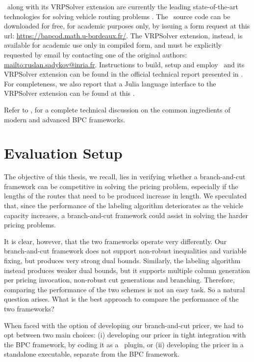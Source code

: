 \medskip

\bapcod\ along with its VRPSolver extension are currently the leading state-of-the-art
technologies for solving vehicle routing problems \parencite{pessoa2020generic}.
The \bapcod\ source code can be downloaded for free, for academic purposes only,
by issuing a form request at this url: \url{https://bapcod.math.u-bordeaux.fr/}.
The VRPSolver extension, instead, is available for academic use only in compiled form,
and must be explicitly requested by email by contacting one of the
original authors: \url{mailto:ruslan.sadykov@inria.fr}.
Instructions to build, setup and employ \bapcod\ and its VRPSolver extension
can be found in the official technical report presented in \textcite{sadykov2021}.
For completeness, we also report that
a Julia language interface to the VRPSolver extension
can be found at this
.

Refer to \textcite{sadykov2019modern},
for a complete technical discussion on the common ingredients of modern and advanced BPC frameworks.

\section{Evaluation Setup}
\label{sec:results-evaluation-setup}

The objective of this thesis, we recall, lies in verifying
whether a branch-and-cut framework can be competitive in solving
the pricing problem, especially if the lengths of the routes
that need to be produced increase in length.
We speculated that,
since the performance of the labeling algorithm deteriorates as the vehicle capacity increases,
a branch-and-cut framework could assist in solving the harder pricing problems.

It is clear, however, that the two frameworks operate very differently.
Our branch-and-cut framework does not support non-robust inequalities and variable fixing,
but produces very strong dual bounds.
Similarly, the labeling algorithm instead produces weaker dual bounds,
but it supports multiple column generation per pricing invocation,
non-robust cut generations and branching.
Therefore, comparing the performance of the two schemes is not an easy task.
So a natural question arises.
What is the best approach to compare the performance of the two frameworks?

\medskip

When faced with the option of developing our branch-and-cut pricer,
we had to opt between two main choices:
(i) developing our pricer in tight integration with the BPC framework,
by coding it as a \bapcod\ plugin,
or (ii) developing the pricer in a standalone executable,
separate from the BPC framework.

